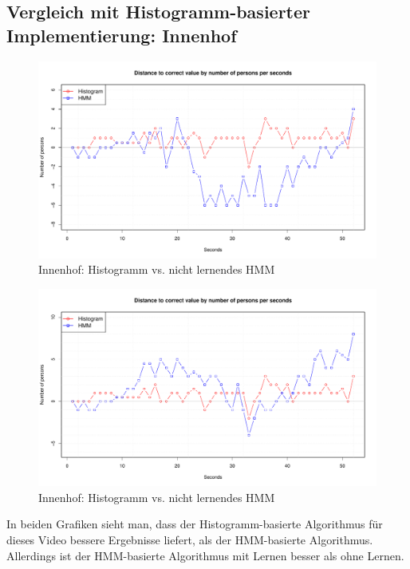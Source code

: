 \subsection{Vergleich mit Histogramm-basierter Implementierung: Innenhof}
\label{sec:eval_innenhof}
\begin{figure}
	\centering
\includegraphics[width=1\textwidth]{bilder/safest_plot_innenhof_910_nolearn.pdf}
\caption{Innenhof: Histogramm vs. nicht lernendes HMM}
	\label{fig:Innenhof_nl}
\end{figure}
\begin{figure}
	\centering
\includegraphics[width=1\textwidth]{bilder/safest_plot_innenhof_910_learn.pdf}
\caption{Innenhof: Histogramm vs. nicht lernendes HMM}
	\label{fig:Innenhof_nl}
\end{figure}
In beiden Grafiken sieht man, dass der Histogramm-basierte Algorithmus für dieses Video bessere Ergebnisse liefert, als der HMM-basierte Algorithmus.\\
Allerdings ist der HMM-basierte Algorithmus mit Lernen besser als ohne Lernen.

